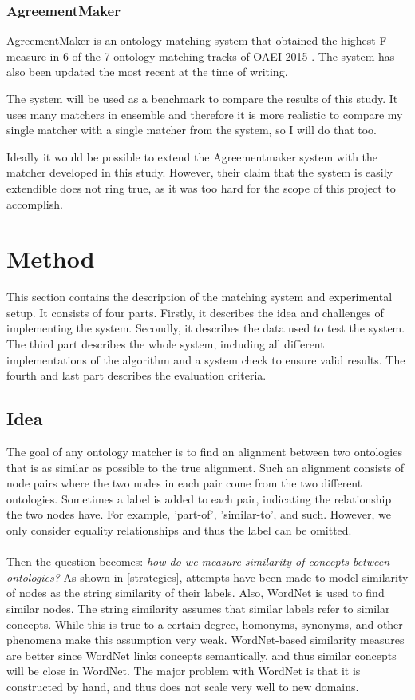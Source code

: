 \documentclass{article}
\begin{document}
 \subsubsection{AgreementMaker} \label{agreementmaker}
 AgreementMaker is an ontology matching system that obtained the highest F-measure in 6 of the 7 ontology matching tracks of OAEI 2015 \cite{oaei2015}. The system has also been updated the most recent at the time of writing\cite{agreementmaker}.
 
 The system will be used as a benchmark to compare the results of this study. It uses many matchers in ensemble and therefore it is more realistic to compare my single matcher with a single matcher from the system, so I will do that too. %
 
 Ideally it would be possible to extend the Agreementmaker system with the matcher developed in this study. However, their claim that the system is easily extendible does not ring true, as it was too hard for the scope of this project to accomplish. %
 
 \newpage
 \section{Method} 
 This section contains the description of the matching system and experimental setup. It consists of four parts. Firstly, it describes the idea and challenges of implementing the system. Secondly, it describes the data used to test the system. The third part describes the whole system, including all different implementations of the algorithm and a system check to ensure valid results. The fourth and last part describes the evaluation criteria.
 
 \subsection{Idea}
The goal of any ontology matcher is to find an alignment between two ontologies that is as similar as possible to the true alignment. Such an alignment consists of node pairs where the two nodes in each pair come from the two different ontologies. Sometimes a label is added to each pair, indicating the relationship the two nodes have. For example, 'part-of', 'similar-to', and such. However, we only consider equality relationships and thus the label can be omitted.
 \paragraph{}
 Then the question becomes: \textit{how do we measure similarity of concepts between ontologies?} As shown in \ref{strategies}, attempts have been made to model similarity of nodes as the string similarity of their labels. Also, WordNet is used to find similar nodes. The string similarity assumes that similar labels refer to similar concepts. While this is true to a certain degree, homonyms, synonyms, and other phenomena make this assumption very weak. WordNet-based similarity measures are better since WordNet links concepts semantically, and thus similar concepts will be close in WordNet. The major problem with WordNet is that it is constructed by hand, and thus does not scale very well to new domains.
\end{document}
